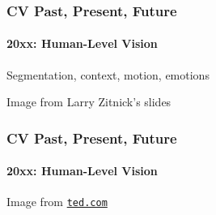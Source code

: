 \documentclass[xetex,professionalfont]{beamer}
\begin{document}
\begin{frame}
\frametitle{CV Past, Present, Future}
\framesubtitle{20xx: Human-Level Vision}

Segmentation, context, motion, emotions

\bigskip
\begin{center}
    {\centering Image from Larry Zitnick's slides}
\end{center}

\end{frame}


\begin{frame}
\frametitle{CV Past, Present, Future}
\framesubtitle{20xx: Human-Level Vision}


\bigskip
\begin{center}
    {\centering Image from \href{https://www.ted.com/talks/fei_fei_li_how_we_re_teaching_computers_to_understand_pictures}{\texttt{ted.com}}}
\end{center}

\end{frame}

\end{document}
